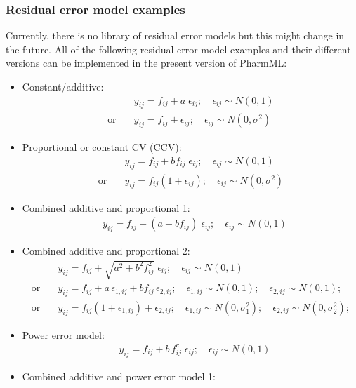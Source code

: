 \subsubsection{Residual error model examples}
\label{subsec:modelExamples}
Currently, there is no library of residual error models but this might change in the future. All of the following residual error model examples and their different versions can be implemented in the present version of PharmML:
\begin{itemize}
\item
Constant/additive:
\begin{align*}
& y_{ij} = f_{ij} + a \; \epsilon_{ij}; \quad \epsilon_{ij} \sim N(0,1)  \\
\text{or} \quad & y_{ij} = f_{ij} + \epsilon_{ij}; \quad \epsilon_{ij} \sim N(0,\sigma^2)
\end{align*}
\item
Proportional or constant CV (CCV):
\begin{align*}
&y_{ij} =  f_{ij} + bf_{ij} \; \epsilon_{ij}; \quad \epsilon_{ij} \sim N(0,1)  \\
\text{or} \quad & y_{ij} =  f_{ij}(1+\epsilon_{ij}); \quad \epsilon_{ij} \sim N(0,\sigma^2)
\end{align*}
\item
Combined additive and proportional 1:
\begin{align*}
& y_{ij} =  f_{ij} + (a + bf_{ij}) \; \epsilon_{ij}; \quad \epsilon_{ij} \sim N(0,1)
\end{align*}
\item
Combined additive and proportional 2:
\begin{align*}
& y_{ij} =  f_{ij} + \sqrt{a^2 + b^2f_{ij}^2} \; \epsilon_{ij}; \quad \epsilon_{ij} \sim N(0,1)  \\
\text{or}  \quad & y_{ij} =  f_{ij} +  a\, \epsilon_{1,ij} + b f_{ij}\, \epsilon_{2,ij}; \quad \epsilon_{1,ij} \sim N(0,1); \quad \epsilon_{2,ij} \sim N(0,1);   \\
\text{or}  \quad & y_{ij} =  f_{ij} (1 + \epsilon_{1,ij}) + \epsilon_{2,ij}; \quad \epsilon_{1,ij} \sim N(0,\sigma_1^2); \quad \epsilon_{2,ij} \sim N(0,\sigma_2^2);
\end{align*}
\item
Power error model:
\begin{align*}
& y_{ij} = f_{ij} + b\,f_{ij}^c \; \epsilon_{ij}; \quad \epsilon_{ij} \sim N(0,1)
\end{align*}
\item
Combined additive and power error model 1:

\end{itemize}
